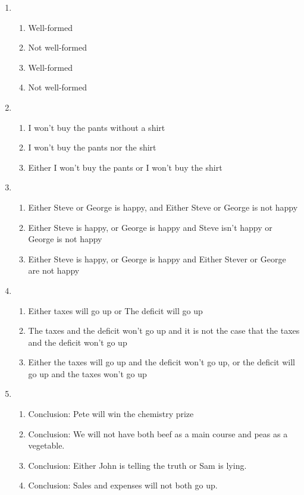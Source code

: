 \begin{enumerate}
\begin{enumerate}
    \end{enumerate}
    \item 
    \begin{enumerate}
        \item Well-formed
        \item Not well-formed
        \item Well-formed
        \item Not well-formed
    \end{enumerate}
    \item 
    \begin{enumerate}
        \item I won't buy the pants without a shirt
        \item I won't buy the pants nor the shirt
        \item Either I won't buy the pants or I won't buy the shirt
    \end{enumerate}
    \item 
    \begin{enumerate}
        \item Either Steve or George is happy, and Either Steve or George is not happy
        \item Either Steve is happy, or George is happy and Steve isn't happy or George is not happy
        \item Either Steve is happy, or George is happy and Either Stever or George are not happy
    \end{enumerate}
    \item 
    \begin{enumerate}
        \item Either taxes will go up or The deficit will go up
        \item The taxes and the deficit won't go up and it is not the case that the taxes and the deficit won't go up
        \item Either the taxes will go up and the deficit won't go up, or the deficit will go up and the taxes won't go up
    \end{enumerate}
    \item 
    \begin{enumerate}
        \item Conclusion: Pete will win the chemistry prize
        \item Conclusion: We will not have both beef as a main course and peas as a vegetable.
        \item Conclusion: Either John is telling the truth or Sam is lying.
        \item Conclusion: Sales and expenses will not both go up.
    \end{enumerate}

\end{enumerate}
